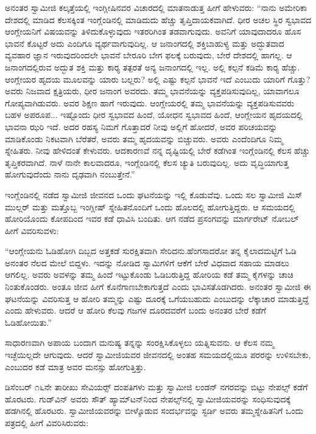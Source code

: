  ಅನಂತರ ಸ್ವಾಮೀಜಿ ಕಲ್ಕತ್ತೆಯಲ್ಲಿ ಇಂಗ್ಲೀಷಿನವರ ವಿಚಾರದಲ್ಲಿ ಮಾತನಾಡುತ್ತ ಹೀಗೆ ಹೇಳುವರು: “ನಾನು ಅಮೇರಿಕಾ ದೇಶದಲ್ಲಿ ಮಾಡಿದ ಕೆಲಸಕ್ಕಿಂತ ಇಂಗ್ಲೆಂಡಿನಲ್ಲಿ ಮಾಡಿದುದು ಹೆಚ್ಚು ತೃಪ್ತಿದಾಯಕವಾಗಿದೆ. ಧೀರ ಅಚಲ ಸ್ಥಿರ ಸ್ವಭಾವದ ಆಂಗ್ಲೇಯನಿಗೆ ವಿಷಯವನ್ನು ತಿಳಿದುಕೊಳ್ಳುವುದು ಇತರರಿಗಿಂತ ತಡವಾಗುವುದು. ಅವನಿಗೆ ಯಾವುದಾದರೂ ಹೊಸ ಭಾವನೆ ಕೊಟ್ಟರೆ ಅದು ಎಂದಿಗೂ ವ್ಯರ್ಥವಾಗುವುದಿಲ್ಲ. ಆ ಜನಾಂಗದಲ್ಲಿ ಶಕ್ತಿಬಾಹುಳ್ಯ ಮತ್ತು ಅದ್ಭುತವಾದ ವ್ಯವಹಾರ ಜ್ಞಾನ ಇರುವುದರಿಂದಲೇ ಭಾವನೆ ಬೇರೂರಿ ಬೇಗ ಫಲಕ್ಕೆ ಬರುವುದು, ಬೇರೆ ದೇಶದಲ್ಲಿ ಹಾಗಲ್ಲ. ಆ ಜನಾಂಗದಲ್ಲಿರುವ ಅದ್ಭುತ ಶಕ್ತಿ ಮತ್ತು ಕಾರ‍್ಯ ತತ್ಪರತೆ ಅನ್ಯ ಜನಾಂಗದಲ್ಲಿ ಇಲ್ಲ. ಅಲ್ಲಿ ಕಲ್ಪನೆ ಕಡಿಮೆ ಕಾರ‍್ಯ ಹೆಚ್ಚು. ಆಂಗ್ಲೇಯರ ಹೃದಯ ಮೂಲವನ್ನು ಯಾರು ಬಲ್ಲರು? ಅಲ್ಲಿ ಎಷ್ಟು ಕಲ್ಪನೆ ಭಾವನೆ ಇದೆ ಎಂಬುದು ಯಾರಿಗೆ ಗೊತ್ತು? ಅವರು ನಿಜವಾದ ಕ್ಷತ್ರಿಯರು, ಧೀರ ಜನಾಂಗ ಅವರದು. ತಮ್ಮ ಭಾವನೆಯನ್ನು ವ್ಯಕ್ತಪಡಿಸುವುದಿಲ್ಲ, ಯಾವಾಗಲೂ ಗೋಪ್ಯವಾಗಿಡುವರು. ಅವರ ಶಿಕ್ಷಣ ಹಾಗೆ ಇರುವುದು. ಆಂಗ್ಲೇಯರಲ್ಲಿ ತಮ್ಮ ಭಾವನೆಯನ್ನು ವ್ಯಕ್ತಪಡಿಸುವವರು ಬಹಳ ಅಪರೂಪ... ಇಷ್ಟೊಂದು ಧೀರ ಸ್ವಭಾವದ ಹಿಂದೆ, ಯೋಧನ ಸ್ವಭಾವದ ಹಿಂದೆ, ಆಂಗ್ಲೇಯನ ಹೃದಯದಲ್ಲಿ ಭಾವನಾ ಝರಿ ಇದೆ. ಅದರ ರಹಸ್ಯ ನಿಮಗೆ ಗೊತ್ತಾದರೆ ನೀವು ಅಲ್ಲಿಗೆ ಹೋದರೆ, ಅವರ ಪರಿಚಯವನ್ನು ಮಾಡಿಕೊಂಡು ನಿಕಟವಾಗಿ ಬೆರೆತರೆ, ಅವರು ತಮ್ಮ ಹೃದಯವನ್ನು ಬಿಚ್ಚುವರು. ಅವರು ಎಂದೆಂದಿಗೂ ನಿಮ್ಮ ಸ್ನೇಹಿತರು. ನೀವು ಹೇಳಿದಂತೆ ಕೇಳುವರು. ಆದಕಾರಣವೆ ನನ್ನ ದೃಷ್ಟಿಯಲ್ಲಿ ಬೇರೆ ಕಡೆಗಿಂತ ಇಂಗ್ಲೆಂಡಿನಲ್ಲಿ ಕೆಲಸ ಹೆಚ್ಚು ತೃಪ್ತಿಕರವಾಗಿದೆ. ನಾಳೆ ನಾನೇ ಕಾಲವಾದರೂ, ಇಂಗ್ಲೆಂಡಿನಲ್ಲಿ ಕೆಲಸ ಚ್ಯುತಿ ಬರುವುದಿಲ್ಲ. ಅದು ವೃದ್ಧಿಯಾಗುತ್ತ ಹೋಗುವುದೆಂದು ನಾನು ದೃಢವಾಗಿ ನಂಬುತ್ತೇನೆ.” 

 ಇಂಗ್ಲೆಂಡಿನಲ್ಲಿ ನಡೆದ ಸ್ವಾಮೀಜಿ ಜೀವನದ ಒಂದು ಘಟನೆಯನ್ನು ಇಲ್ಲಿ ಕೊಡುವೆವು. ಒಂದು ಸಲ ಸ್ವಾಮೀಜಿ ಮಿಸ್ ಮುಲ್ಲರ್ ಮತ್ತು ಮತ್ತೊಬ್ಬ ಇಂಗ್ಲೀಷ್ ಸ್ನೇಹಿತನೊಂದಿಗೆ ಒಂದು ಹೊಲದಲ್ಲಿ ಹೋಗುತ್ತಿದ್ದರು. ಆ ಸಮಯದಲ್ಲಿ ಹೋರಿಯೊಂದು ಕೋಪದಿಂದ ಇವರ ಕಡೆ ಧಾವಿಸಿ ಬಂದಿತು. ಆಗ ನಡೆದ ಪ್ರಸಂಗವನ್ನು ಮಾರ್ಗರೇಟ್ ನೋಬಲ್ ಹೀಗೆ ವಿವರಿಸುವಳು: 

 “ಆಂಗ್ಲೇಯನು ಓಡಿಹೋಗಿ ದಿಬ್ಬದ ಅತ್ತಕಡೆ ಸುರಕ್ಷಿತವಾಗಿ ಸೇರಿದನು.\break ಹೆಂಗಸಾದರೋ ತನ್ನ ಕೈಲಾದಮಟ್ಟಿಗೆ ಓಡಿ ಅನಂತರ ನೆಲದ ಮೇಲೆ ಬಿದ್ದಳು. ಇದನ್ನು ನೋಡಿದ ಸ್ವಾಮಿಗಳಿಗೆ ಆಕೆಗೆ ಬೇರೆ ವಿಧವಾದ ಸಹಾಯ ಮಾಡಲು ಆಗಲಿಲ್ಲ. ಅವರು ಅವಳನ್ನು ತಮ್ಮ ಹಿಂದೆ ಇಟ್ಟುಕೊಂಡು ಓಡಿಬರುತ್ತಿದ್ದ ಹೋರಿಯ ಕಡೆ ತಮ್ಮ ಕೈಗಳನ್ನು ಚಾಚಿ ನಿಂತುಕೊಂಡರು. ಅಂತೂ ಜೀವ ಹೀಗೆ ಕೊನೆಗಾಣಬೇಕಾಗುತ್ತದೆ ಎಂದು ಭಾವಿಸತೊಡಗಿದರು. ಅನಂತರ ಸ್ವಾಮೀಜಿ ಈ ಘಟನೆಯನ್ನು ವಿವರಿಸುತ್ತ ಆ ಹೋರಿ ತಮ್ಮನ್ನು ಎಷ್ಟು ದೂರಕ್ಕೆ ಒಗೆಯಬಹುದು ಎಂಬುದನ್ನು ಲೆಕ್ಕಾಚಾರ ಮಾಡುತ್ತಿದ್ದೆ ಎಂದು ಹೇಳುವರು. ಆದರೆ ಆ ಹೋರಿ ಕೆಲವು ಗಜಗಳ ದೂರದವರೆಗೆ ಬಂದು ಅನಂತರ ಬೇರೆ ಕಡೆಗೆ ಓಡಿಹೋಯಿತು.” 

 ಸಾಧಾರಣವಾಗಿ ಅಪಾಯ ಬಂದಾಗ ಮನುಷ್ಯ ತನ್ನನ್ನು ಸಂರಕ್ಷಿಸಿಕೊಳ್ಳಲು ಯತ್ನಿಸುವನು. ಆ ಕೆಲಸ ನಮ್ಮ ಇಚ್ಛೆಯಿಲ್ಲದೇ ಆಗುವುದು. ಆದರೆ ಸ್ವಾಮೀಜಿಯವರ ಜೀವನದಲ್ಲಿ ಅಂತಹ ಸಮಯದಲ್ಲಿಯೂ ಪರರನ್ನು ಉಳಿಸಬೇಕು, ಎಂಬುದರ ಕಡೆ ಮಾತ್ರ ಅವರ ಮನಸ್ಸು ಹೋಗುತ್ತಿತ್ತು. 

 ಡಿಸೆಂಬರ್ ೧೬ನೇ ತಾರೀಖು ಸೇವಿಯರ್ಸ್‍‍ ದಂಪತಿಗಳು ಮತ್ತು ಸ್ವಾಮೀಜಿ ಲಂಡನ್ ನಗರವನ್ನು ಬಿಟ್ಟು ನೇಪಲ್ಸ್ ಕಡೆಗೆ ಹೊರಟರು. ಗುಡ್‌ವಿನ್ ಅವರು ಸೌತ್ ಹ್ಯಾಮ್‌ಟನ್‌ನಿಂದ ನೇಪಲ್ಸ್‌ನಲ್ಲಿ ಸ್ವಾಮೀಜಿಯವರನ್ನು ಸಂಧಿಸುವುದಕ್ಕೆ ಹಡಗಿನಲ್ಲಿ ಹೊರಟರು. ಸ್ವಾಮೀಜಿಯವರನ್ನು ಬೀಳ್ಕೊಡುವ ಸಂದರ್ಭವನ್ನು ಸ್ಟರ್ಡಿ ಅವರು ತಮ್ಮ\break ಸ್ನೇಹಿತನಿಗೆ ಒಂದು ಪತ್ರದಲ್ಲಿ ಹೀಗೆ ವಿವರಿಸಿರುವರು:

